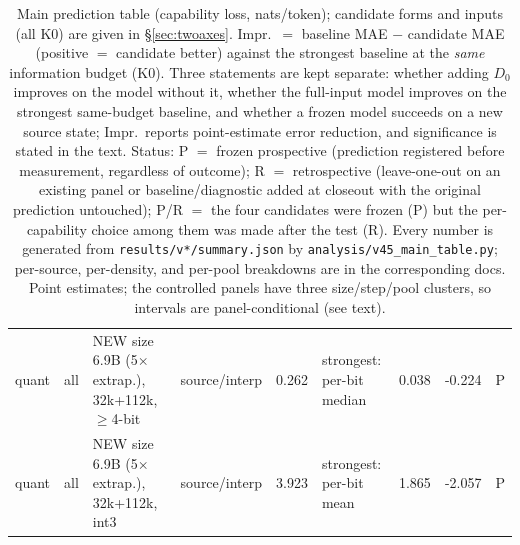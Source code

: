 \begin{table}
\begin{tabular}{@{}llp{4.6cm}lrp{3.2cm}rrl@{}}
\midrule
quant & all & NEW size 6.9B (5$\times$ extrap.), 32k+112k, $\ge$4-bit & source/interp & 0.262 & strongest: per-bit median & 0.038 & -0.224 & P \\
quant & all & NEW size 6.9B (5$\times$ extrap.), 32k+112k, int3 & source/interp & 3.923 & strongest: per-bit mean & 1.865 & -2.057 & P \\
\bottomrule
\end{tabular}
\caption{Main prediction table (capability loss, nats/token); candidate forms and inputs (all K0) are given in \S\ref{sec:twoaxes}. Impr.\ $=$ baseline MAE $-$ candidate MAE (positive $=$ candidate better) against the strongest baseline at the \emph{same} information budget (K0). Three statements are kept separate: whether adding $D_0$ improves on the model without it, whether the full-input model improves on the strongest same-budget baseline, and whether a frozen model succeeds on a new source state; Impr.\ reports point-estimate error reduction, and significance is stated in the text. Status: P $=$ frozen prospective (prediction registered before measurement, regardless of outcome); R $=$ retrospective (leave-one-out on an existing panel or baseline/diagnostic added at closeout with the original prediction untouched); P/R $=$ the four candidates were frozen (P) but the per-capability choice among them was made after the test (R). Every number is generated from \texttt{results/v*/summary.json} by \texttt{analysis/v45\_main\_table.py}; per-source, per-density, and per-pool breakdowns are in the corresponding docs. Point estimates; the controlled panels have three size/step/pool clusters, so intervals are panel-conditional (see text).}
\label{tab:main}
\end{table}
